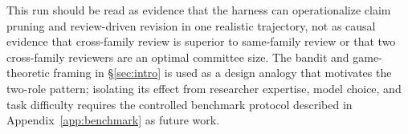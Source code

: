 This run should be read as evidence that the harness can operationalize claim pruning and review-driven revision in one realistic trajectory, not as causal evidence that cross-family review is superior to same-family review or that two cross-family reviewers are an optimal committee size.
The bandit and game-theoretic framing in \S\ref{sec:intro} is used as a design analogy that motivates the two-role pattern; isolating its effect from researcher expertise, model choice, and task difficulty requires the controlled benchmark protocol described in Appendix~\ref{app:benchmark} as future work.
